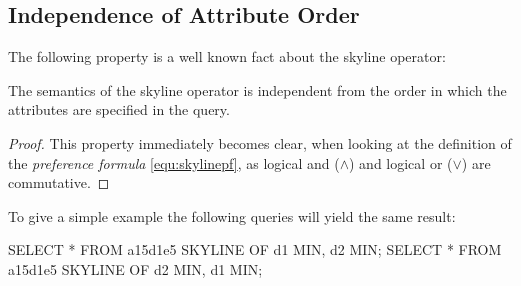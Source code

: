 \subsection{Independence of Attribute Order}
\label{sec:attributeorder}

The following property is a well known fact about the skyline operator:

\begin{property}\label{the:attributeorder}
The semantics of the skyline operator is independent from the order
in which the attributes are specified in the query.
\end{property}
\begin{proof}
This property immediately becomes clear, when looking at the definition
of the \emph{preference formula} \eqref{equ:skylinepf}, as
logical and ($\land$) and logical or ($\lor$) are commutative.
\end{proof}

\noindent
To give a simple example the following queries will yield the same
result:

\begin{interactive}
SELECT * FROM a15d1e5 SKYLINE OF d1 MIN, d2 MIN;
SELECT * FROM a15d1e5 SKYLINE OF d2 MIN, d1 MIN;
\end{interactive}

